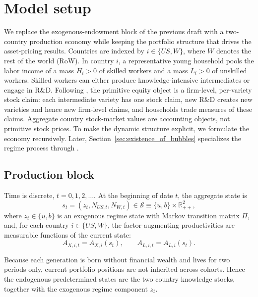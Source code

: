 \documentclass{article}
\begin{document}
{
\maketitle
}

\section{Model setup}

We replace the exogenous-endowment block of the previous draft with a two-country production economy while keeping the portfolio structure that drives the asset-pricing results. Countries are indexed by $i\in\{US,W\}$, where $W$ denotes the rest of the world (RoW). In country $i$, a representative young household pools the labor income of a mass $H_i>0$ of skilled workers and a mass $L_i>0$ of unskilled workers. Skilled workers can either produce knowledge-intensive intermediates or engage in R\&D. Following \citet{hirano2025technological}, the primitive equity object is a firm-level, per-variety stock claim: each intermediate variety has one stock claim, new R\&D creates new varieties and hence new firm-level claims, and households trade measures of these claims. Aggregate country stock-market values are accounting objects, not primitive stock prices. To make the dynamic structure explicit, we formulate the economy recursively. Later, Section~\ref{sec:existence_of_bubbles} specializes the regime process through .

\subsection{Production block}

\begin{ass}\label{ass_recursive_state}
Time is discrete, $t=0,1,2,\ldots$. At the beginning of date $t$, the aggregate state is
\[
s_t=(z_t,N_{US,t},N_{W,t})\in\mathcal S\equiv \{u,b\}\times\mathbb R_{++}^2,
\]
where $z_t\in\{u,b\}$ is an exogenous regime state with Markov transition matrix $\Pi$, and, for each country $i\in\{US,W\}$, the factor-augmenting productivities are measurable functions of the current state:
\[
A_{X,i,t}=A_{X,i}(s_t),
\qquad
A_{L,i,t}=A_{L,i}(s_t).
\]
\end{ass}

Because each generation is born without financial wealth and lives for two periods only, current portfolio positions are not inherited across cohorts. Hence the endogenous predetermined states are the two country knowledge stocks, together with the exogenous regime component $z_t$.
\end{document}
